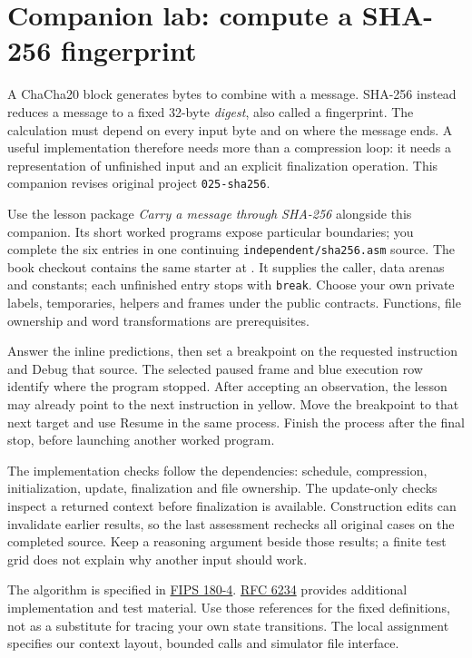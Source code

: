 \section{Companion lab: compute a SHA-256 fingerprint}
\label{revision-lab:sha256}

A ChaCha20 block generates bytes to combine with a message. SHA-256 instead
reduces a message to a fixed 32-byte \emph{digest}, also called a fingerprint.
The calculation must depend on every input byte and on where the message ends.
A useful implementation therefore needs more than a compression loop: it needs
a representation of unfinished input and an explicit finalization operation.
This companion revises original project \texttt{025-sha256}.

Use the lesson package \emph{Carry a message through SHA-256} alongside this
companion. Its short worked programs expose particular boundaries; you complete
the six entries in one continuing \texttt{independent/sha256.asm} source. The book checkout contains the same starter at
.
It supplies the caller, data arenas and constants; each unfinished entry stops
with \texttt{break}. Choose your own private labels, temporaries, helpers and
frames under the public contracts. Functions, file ownership and word
transformations are prerequisites.

Answer the inline predictions, then set a breakpoint on the requested instruction
and Debug that source. The selected paused frame and blue execution row identify
where the program stopped. After accepting an observation, the lesson may already
point to the next instruction in yellow. Move the breakpoint to that next target
and use Resume in the same process. Finish the process after the final stop,
before launching another worked program.



The implementation checks follow the dependencies: schedule, compression,
initialization, update, finalization and file ownership. The update-only checks
inspect a returned context before finalization is available. Construction edits
can invalidate earlier results, so the last assessment rechecks all original
cases on the completed source. Keep a reasoning argument beside those results;
a finite test grid does not explain why another input should work.

The algorithm is specified in
\href{https://doi.org/10.6028/NIST.FIPS.180-4}{FIPS 180-4}.
\href{https://www.rfc-editor.org/rfc/rfc6234.html}{RFC 6234} provides additional
implementation and test material. Use those references for the fixed definitions,
not as a substitute for tracing your own state transitions. The local assignment
specifies our context layout, bounded calls and simulator file interface.

